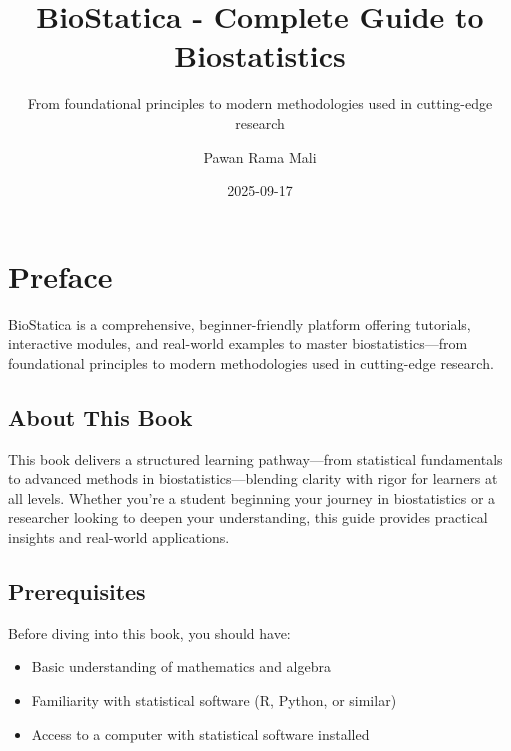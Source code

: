 \documentclass[
  11pt,
  letterpaper,
  oneside]{book}
\title{BioStatica - Complete Guide to Biostatistics}
\subtitle{From foundational principles to modern methodologies used in
cutting-edge research}
\author{Pawan Rama Mali}
\date{2025-09-17}
\providecommand{\tightlist}{%
  \setlength{\itemsep}{0pt}\setlength{\parskip}{0pt}}\usepackage{longtable,booktabs,array}
\renewcommand*\contentsname{Table of contents}
\newcommand\contentsname{Table of contents}
\begin{document}
\frontmatter
\maketitle

\renewcommand*\contentsname{Table of contents}
{
\hypersetup{linkcolor=}
\setcounter{tocdepth}{2}
\tableofcontents
}

\mainmatter
{}

\chapter*{Preface}\label{preface}


BioStatica is a comprehensive, beginner-friendly platform offering
tutorials, interactive modules, and real-world examples to master
biostatistics---from foundational principles to modern methodologies
used in cutting-edge research.

\section*{About This Book}\label{about-this-book}


This book delivers a structured learning pathway---from statistical
fundamentals to advanced methods in biostatistics---blending clarity
with rigor for learners at all levels. Whether you're a student
beginning your journey in biostatistics or a researcher looking to
deepen your understanding, this guide provides practical insights and
real-world applications.

\section*{Prerequisites}\label{prerequisites}


Before diving into this book, you should have:

\begin{itemize}
\tightlist
\item
  Basic understanding of mathematics and algebra
\item
  Familiarity with statistical software (R, Python, or similar)
\item
  Access to a computer with statistical software installed
\end{itemize}
\end{document}
